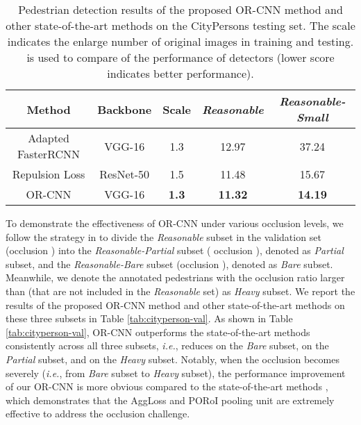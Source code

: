 \documentclass[runningheads]{llncs}
\def\ie{{\em i.e.}}
\begin{document}
\begin{table*}[t]
\centering
\caption{Pedestrian detection results of the proposed OR-CNN method and other state-of-the-art methods on the CityPersons testing set. The scale indicates the enlarge number of original images in training and testing.  is used to compare of the performance of detectors (lower score indicates better performance).}
\small \setlength{\tabcolsep}{5.5pt}
\begin{tabular}{c|c|c|cc}
\toprule[1.5pt]
Method &Backbone &Scale &{\em Reasonable} &{\em Reasonable-Small} \\\hline
Adapted FasterRCNN \cite{DBLP:conf/cvpr/ZhangBS17} & VGG-16 &1.3 &12.97 &37.24 \\Repulsion Loss \cite{DBLP:journals/corr/abs-1711-07752} & ResNet-50 &1.5 &11.48 &15.67 \\\hline
OR-CNN & VGG-16 &\textbf{1.3} &\textbf{11.32} &\textbf{14.19} \\\bottomrule[1.5pt]
\end{tabular}
\label{tab:cityperson-test}
\end{table*}

To demonstrate the effectiveness of OR-CNN under various occlusion levels, we follow the strategy in \cite{DBLP:journals/corr/abs-1711-07752} to divide the {\em Reasonable} subset in the validation set (occlusion ) into the {\em Reasonable-Partial} subset ( occlusion ), denoted as {\em Partial} subset, and the {\em Reasonable-Bare} subset (occlusion ), denoted as {\em Bare} subset. Meanwhile, we denote the annotated pedestrians with the occlusion ratio larger than  (that are not included in the {\em Reasonable} set) as {\em Heavy} subset. We report the results of the proposed OR-CNN method and other state-of-the-art methods \cite{DBLP:journals/corr/abs-1711-07752,DBLP:conf/cvpr/ZhangBS17} on these three subsets in Table \ref{tab:cityperson-val}. As shown in Table \ref{tab:cityperson-val}, OR-CNN outperforms the state-of-the-art methods consistently across all three subsets, \ie, reduces   on the {\em Bare} subset,   on the {\em Partial} subset, and   on the {\em Heavy} subset. Notably, when the occlusion becomes severely (\ie, from {\em Bare} subset to {\em Heavy} subset), the performance improvement of our OR-CNN is more obvious compared to the state-of-the-art methods \cite{DBLP:journals/corr/abs-1711-07752,DBLP:conf/cvpr/ZhangBS17}, which demonstrates that the AggLoss and PORoI pooling unit are extremely effective to address the occlusion challenge.
\end{document}
